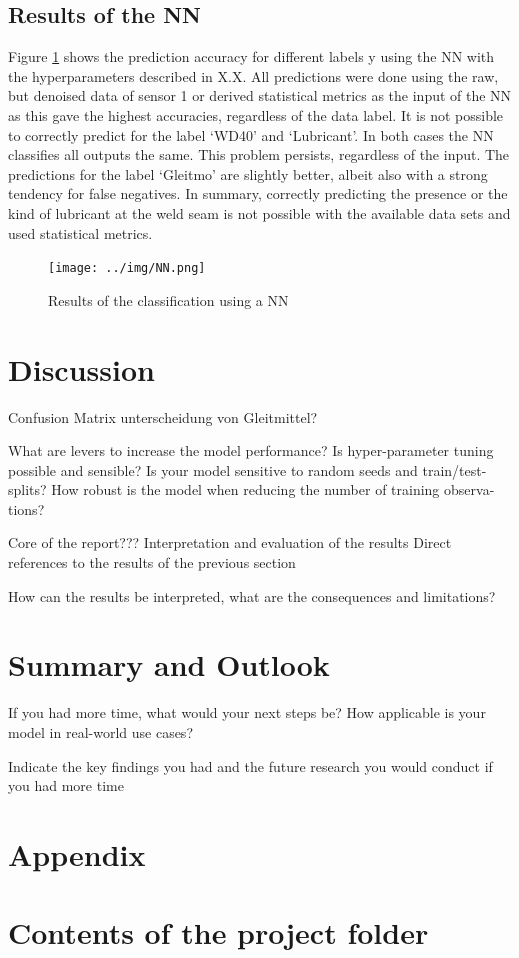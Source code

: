 \documentclass[12pt]{report}
\begin{document}
\section{Results of the NN}
Figure \ref{fig:NN} shows the prediction accuracy for different labels y using the NN with the hyperparameters described in X.X. All predictions were done using the raw, but denoised data of sensor 1 or derived statistical metrics as the input of the NN as this gave the highest accuracies, regardless of the data label.
It is not possible to correctly predict for the label ‘WD40’ and ‘Lubricant’. In both cases the NN classifies all outputs the same. This problem persists, regardless of the input.
The predictions for the label ‘Gleitmo’ are slightly better, albeit also with a strong tendency for false negatives. 
In summary, correctly predicting the presence or the kind of lubricant at the weld seam is not possible with the available data sets and used statistical metrics.

\begin{figure}[H]
	\centering
	\texttt{[image: ../img/NN.png]}
	\caption{Results of the classification using a NN}
	\label{fig:NN}
\end{figure}

\chapter{Discussion}
Confusion Matrix
unterscheidung von Gleitmittel?

What are levers to increase the model performance? Is hyper-parameter tuning possible and
sensible? Is your model sensitive to random seeds and train/test-splits?
How robust is the model when reducing the number of training observa-
tions?

Core of the report???
Interpretation and evaluation of the results
Direct references to the results of the previous section

How can the results be interpreted, what are the consequences and
limitations?


\chapter{Summary and Outlook}
If you had more time, what would your next steps be? How applicable
is your model in real-world use cases?

Indicate the key findings you had and the future research you would
conduct if you had more time

\chapter{Appendix}
\printbibliography
\chapter{Contents of the project folder}
\end{document}
